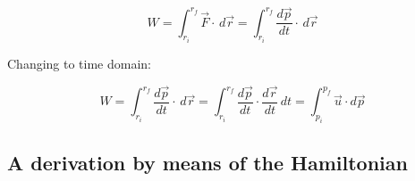 \documentclass[letterpaper, 12pt]{article}
\begin{document}
\begin{equation}
		W = \int_{r_i}^{r_f} \vec{F} \cdot \,d\vec{r} = \int_{r_i}^{r_f} \frac{d\vec{p}}{dt} \cdot \,d\vec{r} 
\end{equation}

Changing to time domain:

\begin{equation}
	W = \int_{r_i}^{r_f} \frac{d\vec{p}}{dt} \cdot \,d\vec{r}  = \int_{r_i}^{r_f} \frac{d\vec{p}}{dt} \cdot \frac{d\vec{r}}{dt} \,dt   = \int_{p_i}^{p_f} \vec{u} \cdot  d\vec{p}
\end{equation}

\subsection{A derivation by means of the Hamiltonian}
\end{document}
